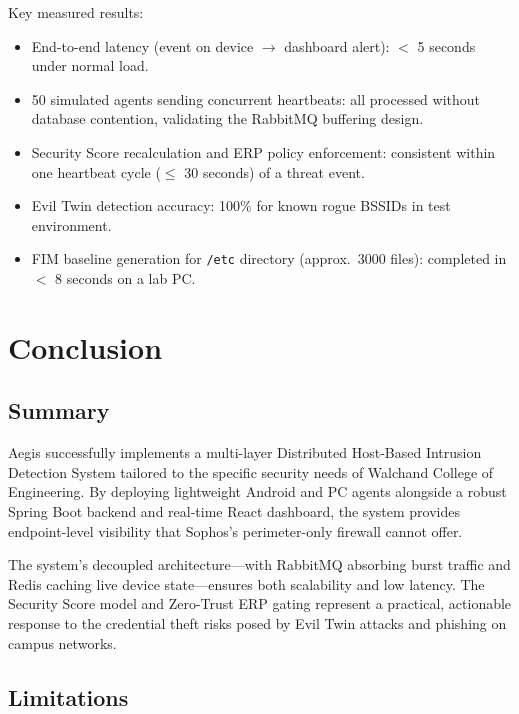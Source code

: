 \documentclass[12pt,a4paper]{report}
\begin{document}
\noindent Key measured results:
\begin{itemize}[leftmargin=*, noitemsep]
  \item End-to-end latency (event on device $\rightarrow$ dashboard alert): $<$ 5 seconds under normal load.
  \item 50 simulated agents sending concurrent heartbeats: all processed without database contention, validating the RabbitMQ buffering design.
  \item Security Score recalculation and ERP policy enforcement: consistent within one heartbeat cycle ($\leq$ 30 seconds) of a threat event.
  \item Evil Twin detection accuracy: 100\% for known rogue BSSIDs in test environment.
  \item FIM baseline generation for \texttt{/etc} directory (approx.\ 3000 files): completed in $<$ 8 seconds on a lab PC.
\end{itemize}

\chapter{Conclusion}

\section{Summary}

Aegis successfully implements a multi-layer Distributed Host-Based Intrusion Detection System tailored to the specific security needs of Walchand College of Engineering. By deploying lightweight Android and PC agents alongside a robust Spring Boot backend and real-time React dashboard, the system provides endpoint-level visibility that Sophos's perimeter-only firewall cannot offer.

The system's decoupled architecture—with RabbitMQ absorbing burst traffic and Redis caching live device state—ensures both scalability and low latency. The Security Score model and Zero-Trust ERP gating represent a practical, actionable response to the credential theft risks posed by Evil Twin attacks and phishing on campus networks.

\section{Limitations}
\end{document}
